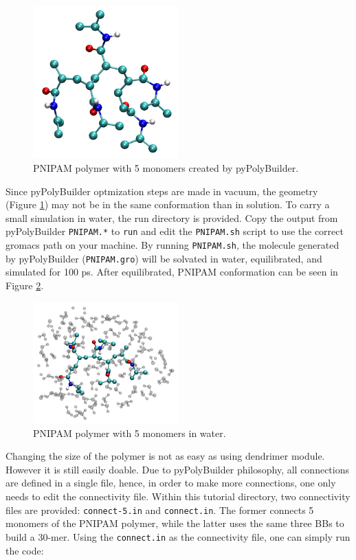 \begin{figure}
    \center
    \includegraphics[width=0.5\textwidth]{PNIPAM/PNIPAMPPB.pdf}
    \caption{PNIPAM polymer with 5 monomers created by pyPolyBuilder.}
    \label{fig:PNIPAMPPB}
\end{figure}

Since pyPolyBuilder optmization steps are made in vacuum, the geometry (Figure \ref{fig:PNIPAMPPB}) may not be in the same conformation than in solution.
To carry a small simulation in water, the run directory is provided.
Copy the output from pyPolyBuilder \texttt{PNIPAM.*} to \texttt{run} and edit the \texttt{PNIPAM.sh} script to use the correct gromacs path on your machine.
By running \texttt{PNIPAM.sh}, the molecule generated by pyPolyBuilder (\texttt{PNIPAM.gro}) will be solvated in water, equilibrated, and simulated for 100 ps.
After equilibrated, PNIPAM conformation can be seen in Figure \ref{fig:PNIPAMSOL}.

\begin{figure}
    \center
    \includegraphics[width=0.5\textwidth]{PNIPAM/PNIPAMSOL.pdf}
    \caption{PNIPAM polymer with 5 monomers in water.}
    \label{fig:PNIPAMSOL}
\end{figure}

Changing the size of the polymer is not as easy as using dendrimer module.
However it is still easily doable.
Due to pyPolyBuilder philosophy, all connections are defined in a single file, hence, in order to make more connections, one only needs to edit the connectivity file.
Within this tutorial directory, two connectivity files are provided: \texttt{connect-5.in} and \texttt{connect.in}.
The former connects 5 monomers of the PNIPAM polymer, while the latter uses the same three BBs to build a 30-mer.
Using the \texttt{connect.in} as the connectivity file, one can simply run the code:


